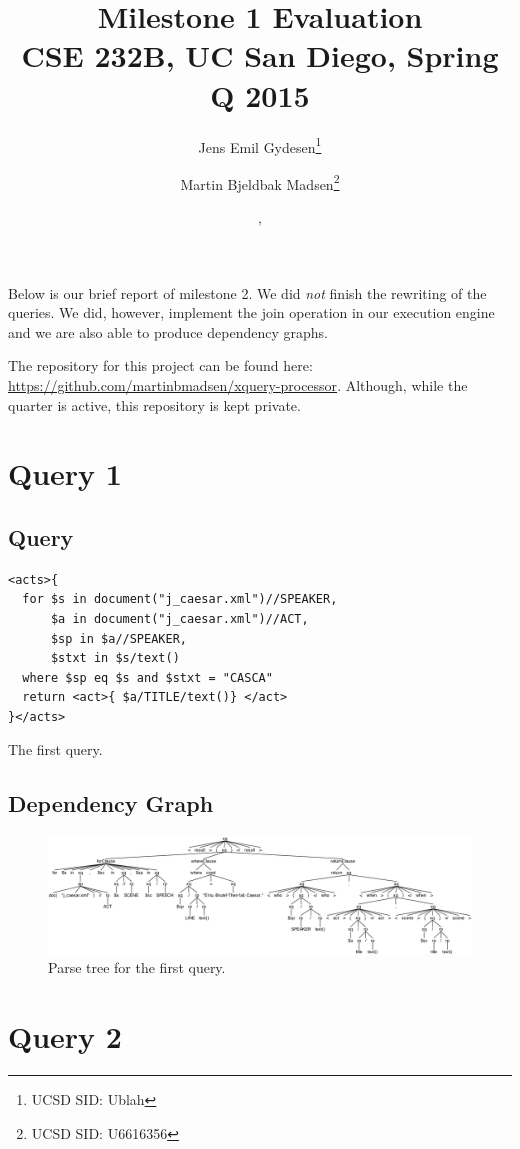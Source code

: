 \documentclass{article}
\title{Milestone 1 Evaluation\\
{\small CSE 232B, UC San Diego, Spring Q 2015}}
\author{Jens Emil Gydesen\thanks{UCSD SID: Ublah} \and
        Martin Bjeldbak Madsen\thanks{UCSD SID: U6616356}}
\date{\DTMdisplaydate{2015}{5}{13}{3}, \DTMdisplaytime{11}{10}{00}}
\begin{document}
\maketitle

Below is our brief report of milestone 2. We did \emph{not} finish the rewriting of the queries. We did, however, implement the join operation in our execution engine and we are also able to produce dependency graphs. 

The repository for this project can be found here: \url{https://github.com/martinbmadsen/xquery-processor}. Although, while the quarter is active, this repository is kept private.

\section{Query 1}

\subsection{Query}\label{sec:query1query}

\begin{listing}[H]
\begin{verbatim}
<acts>{
  for $s in document("j_caesar.xml")//SPEAKER, 
      $a in document("j_caesar.xml")//ACT, 
      $sp in $a//SPEAKER,
      $stxt in $s/text()
  where $sp eq $s and $stxt = "CASCA"
  return <act>{ $a/TITLE/text()} </act>
}</acts>
\end{verbatim}
\caption{The first query.}\label{lst:query1}
\end{listing}

\subsection{Dependency Graph}
\begin{figure}[H]
  \centering
  \includegraphics[width=\linewidth]{imgs/antlr4_parse_tree_query_1.png}
  \caption{Parse tree for the first query.}\label{fig:parseTree1}
\end{figure}

\section{Query 2}
\end{document}

